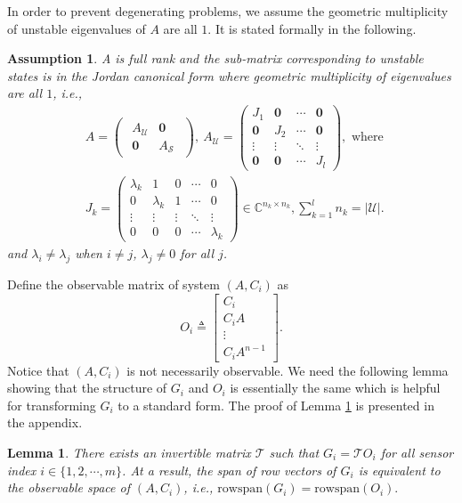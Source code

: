 \documentclass[journal]{IEEEtran}
\newcommand{\Cb}{{\mathbb{C}}}
\newcommand{\Uc}{{\mathcal{U}}}
\newcommand{\Tc}{{\mathcal{T}}}
\newcommand{\Sc}{{\mathcal{S}}}
\newcommand{\rs}{\text{rowspan}}
\newtheorem{lemma}{\textbf{Lemma}}
\newtheorem{assumption}{\textbf{Assumption}}
\begin{document}
	In order to prevent degenerating problems, we assume the geometric multiplicity of unstable eigenvalues of $A$ are all $1$. It is stated formally in the following.
	\begin{assumption}
		A is full rank and the sub-matrix corresponding to unstable states is in the Jordan canonical form where geometric multiplicity of eigenvalues are all $1$, i.e.,
		\begin{align*}
			&A=
			\begin{pmatrix}
				\begin{array}{cc}
					A_\Uc & \mathbf{0} \\
					\mathbf{0} & A_{\Sc}			
				\end{array}
			\end{pmatrix}, \
			A_\Uc=\begin{pmatrix}
				J_{1} & \mathbf{0} & \cdots & \mathbf{0} \\
				\mathbf{0} & J_{2} & \cdots & \mathbf{0} \\
				\vdots & \vdots & \ddots & \vdots \\
				\mathbf{0} & \mathbf{0} & \cdots & J_{l} 
			\end{pmatrix},
			\text{ where }\\
			&
			J_k=
			\begin{pmatrix}
				\lambda_{k} & 1 & 0 & \cdots & {0} \\
				{0} & \lambda_{k} & 1 &  \cdots & {0} \\
				\vdots & \vdots &  \vdots & \ddots & \vdots \\
				{0} & {0} & {0} & \cdots & \lambda_{k} 
			\end{pmatrix}
			\in \Cb^{n_k \times n_k} , \sum_{k=1}^{l}n_k =|\Uc| .
		\end{align*}
		and $\lambda_i\neq \lambda_j$ when $i\neq j$, $\lambda_j\neq 0$ for all $j$.
	\end{assumption}
	
	
	Define the observable matrix of system $(A,C_i)$ as 
	$$
	O_{i} \triangleq\left[\begin{array}{c}
		C_{i} \\
		C_{i} A \\
		\vdots \\
		C_{i} A^{n-1}
	\end{array}\right].
	$$
	Notice that $(A,C_i)$ is not necessarily observable.
	We need the following lemma showing that the structure of $G_i$ and $O_i$ is essentially the same which is helpful for transforming $G_i$ to a standard form. The proof of Lemma \ref{lm:span} is presented in the appendix.
	\begin{lemma}\label{lm:span}
		There exists an invertible matrix $\Tc$ such that $G_i=\Tc O_i$ for all sensor index $i\in\{1,2,\cdots,m\}$. At a result, the span of row vectors of $G_i$ is equivalent to the observable space of $(A,C_i)$, i.e.,
		$\rs(G_i)=\rs(O_i).$
	\end{lemma}
	
\end{document}
